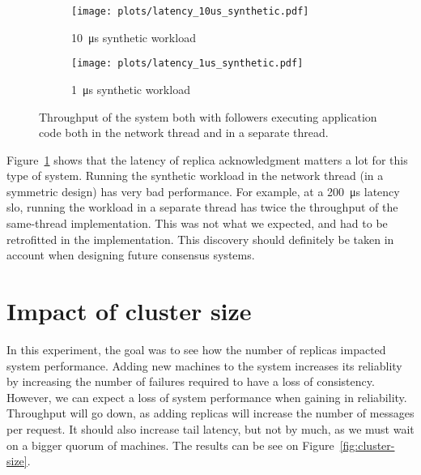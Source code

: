 \begin{figure}[p]
    \centering
    \begin{subfigure}[t]{0.8\textwidth}
        \texttt{[image: plots/latency\_10us\_synthetic.pdf]}
        \caption{\SI{10}{\micro\second} synthetic workload}
    \end{subfigure}

    \begin{subfigure}[t]{0.8\textwidth}
        \texttt{[image: plots/latency\_1us\_synthetic.pdf]}
        \caption{\SI{1}{\micro\second} synthetic workload}
    \end{subfigure}
    \caption{
        Throughput of the system both with followers executing application code both in the network thread and in a separate thread. 
        \label{fig:latency-throughput}
    }
\end{figure}

Figure~\ref{fig:latency-throughput} shows that the latency of replica acknowledgment matters a lot for this type of system.
Running the synthetic workload in the network thread (in a symmetric design) has very bad performance.
For example, at a \SI{200}{\micro\second} latency \gls{slo}, running the workload in a separate thread has twice the throughput of the same-thread implementation.
This was not what we expected, and had to be retrofitted in the implementation.
This discovery should definitely be taken in account when designing future consensus systems.

\section{Impact of cluster size}


In this experiment, the goal was to see how the number of replicas impacted system performance.
Adding new machines to the system increases its reliablity by increasing the number of failures required to have a loss of consistency.
However, we can expect a loss of system performance when gaining in reliability.
Throughput will go down, as adding replicas will increase the number of messages per request.
It should also increase tail latency, but not by much, as we must wait on a bigger quorum of machines.
The results can be see on Figure~\ref{fig:cluster-size}.

